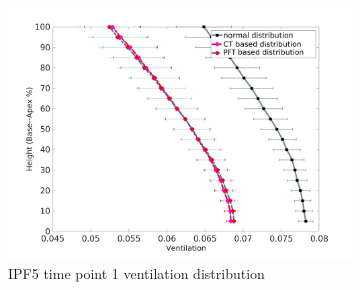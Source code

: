 \begin{figure}[htbp]  
\centering
\begin{subfigure}{.6\linewidth}%
  \includegraphics[width=\linewidth,trim={{.0\wd0} {.0\wd0} {.0\wd0} {.0\wd0}},clip]{Appendix/Image_AppexB/IPF511/IPF511_VentilationAgainstLungHeight.jpg} %
  \caption{IPF5 time point 1 ventilation distribution}
  \label{fig:VQDistribution-a} 
\end{subfigure} 
\begin{subfigure}{.6\linewidth}%

\end{subfigure}
\end{figure}
